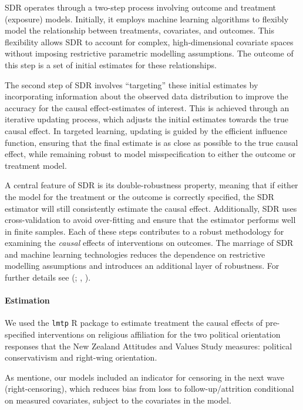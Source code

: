 \documentclass[
  singlecolumn]{article}
\let\oldparagraph\paragraph
\renewcommand{\paragraph}[1]{\oldparagraph{#1}\mbox{}}
\begin{document}
SDR operates through a two-step process involving outcome and treatment
(exposure) models. Initially, it employs machine learning algorithms to
flexibly model the relationship between treatments, covariates, and
outcomes. This flexibility allows SDR to account for complex,
high-dimensional covariate spaces without imposing restrictive
parametric modelling assumptions. The outcome of this step is a set of
initial estimates for these relationships.

The second step of SDR involves ``targeting'' these initial estimates by
incorporating information about the observed data distribution to
improve the accuracy for the causal effect-estimates of interest. This
is achieved through an iterative updating process, which adjusts the
initial estimates towards the true causal effect. In targeted learning,
updating is guided by the efficient influence function, ensuring that
the final estimate is as close as possible to the true causal effect,
while remaining robust to model misspecification to either the outcome
or treatment model.

A central feature of SDR is its double-robustness property, meaning that
if either the model for the treatment or the outcome is correctly
specified, the SDR estimator will still consistently estimate the causal
effect. Additionally, SDR uses cross-validation to avoid over-fitting
and ensure that the estimator performs well in finite samples. Each of
these steps contributes to a robust methodology for examining the
\emph{causal} effects of interventions on outcomes. The marriage of SDR
and machine learning technologies reduces the dependence on restrictive
modelling assumptions and introduces an additional layer of robustness.
For further details see (; ,
).

\paragraph{Estimation}\label{estimation}

We used the \texttt{lmtp} R package to estimate treatment the causal
effects of pre-specified interventions on religious affiliation for the
two political orientation responses that the New Zealand Attitudes and
Values Study measures: political conservativism and right-wing
orientation.

As mentione, our models included an indicator for censoring in the next
wave (right-censoring), which reduces bias from loss to
follow-up/attrition conditional on measured covariates, subject to the
covariates in the model.
\end{document}
